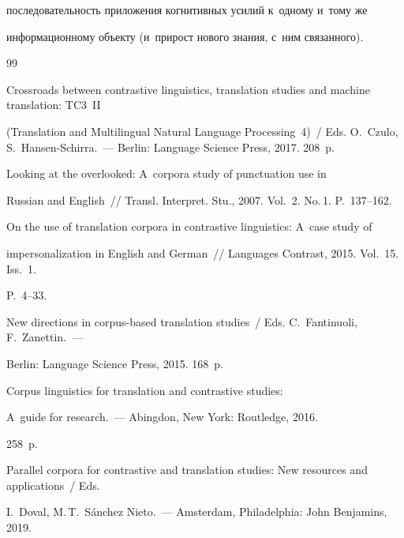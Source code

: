 последовательность приложения когнитивных усилий к~одному и~тому же 


информационному объекту (и~прирост нового знания, с~ним связанного).


  


{\small\frenchspacing


{%




\begin{thebibliography}{99}




Crossroads between contrastive linguistics, translation studies and machine translation: TC3~II 


(Translation and Multilingual Natural Language Processing~4)~/ Eds. O.~Czulo, S.~Hansen-Schirra.~--- Berlin: Language Science Press, 2017. 208~p. 




 Looking at the overlooked: A~corpora study of punctuation use in 


Russian and English~/\!\!/ Transl. Interpret. Stu., 2007. Vol.~2. No.\,1. P.~137--162.




 On the use of translation corpora in contrastive linguistics: A~case study of 


impersonalization in English and German~/\!\!/ Languages Contrast, 2015. Vol.~15. Iss.~1.  


P.~4--33.




New directions in corpus-based translation studies~/ Eds. C.~Fantinuoli, F.~Zanettin.~--- 


Berlin: Language Science Press, 2015. 168~p.




 Corpus linguistics for translation and contrastive studies: 


A~guide for research.~--- Abingdon, New York: Routledge, 2016. 


258~p.




Parallel corpora for contrastive and translation studies: New resources and applications~/ Eds. 


I.~Doval, M.\,T.~S\'{a}nchez Nieto.~--- Amsterdam, Philadelphia: John Benjamins, 2019. 



\end{thebibliography}}}
